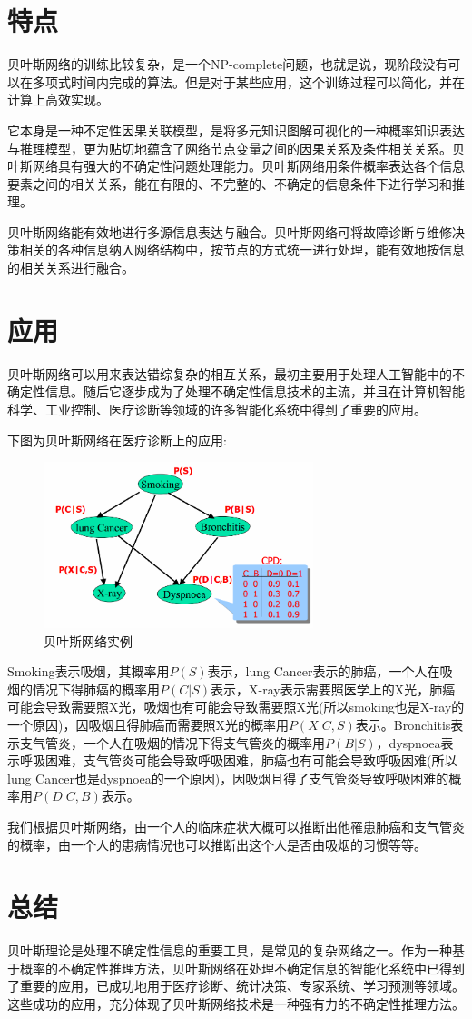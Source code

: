 \documentclass[11pt]{article}
\begin{document}
	\section{特点}
		贝叶斯网络的训练比较复杂，是一个NP-complete问题，也就是说，现阶段没有可以在多项式时间内完成的算法。但是对于某些应用，这个训练过程可以简化，并在计算上高效实现。\par
		它本身是一种不定性因果关联模型，是将多元知识图解可视化的一种概率知识表达与推理模型，更为贴切地蕴含了网络节点变量之间的因果关系及条件相关关系。贝叶斯网络具有强大的不确定性问题处理能力。贝叶斯网络用条件概率表达各个信息要素之间的相关关系，能在有限的、不完整的、不确定的信息条件下进行学习和推理。\par
		贝叶斯网络能有效地进行多源信息表达与融合。贝叶斯网络可将故障诊断与维修决策相关的各种信息纳入网络结构中，按节点的方式统一进行处理，能有效地按信息的相关关系进行融合。
	
	\section{应用}
		贝叶斯网络可以用来表达错综复杂的相互关系，最初主要用于处理人工智能中的不确定性信息。随后它逐步成为了处理不确定性信息技术的主流，并且在计算机智能科学、工业控制、医疗诊断等领域的许多智能化系统中得到了重要的应用。\par
		下图为贝叶斯网络在医疗诊断上的应用:\par
		\begin{figure}[htbp]
			\centering
			\includegraphics[width=0.7\textwidth]{img/instance.png}
			\caption{贝叶斯网络实例}
			\label{003}
		\end{figure}
		Smoking表示吸烟，其概率用$P(S)$表示，lung Cancer表示的肺癌，一个人在吸烟的情况下得肺癌的概率用$P(C|S)$表示，X-ray表示需要照医学上的X光，肺癌可能会导致需要照X光，吸烟也有可能会导致需要照X光(所以smoking也是X-ray的一个原因)，因吸烟且得肺癌而需要照X光的概率用$P(X|C,S)$表示。Bronchitis表示支气管炎，一个人在吸烟的情况下得支气管炎的概率用$P(B|S)$，dyspnoea表示呼吸困难，支气管炎可能会导致呼吸困难，肺癌也有可能会导致呼吸困难(所以lung Cancer也是dyspnoea的一个原因)，因吸烟且得了支气管炎导致呼吸困难的概率用$P(D|C,B)$表示。\par
		我们根据贝叶斯网络，由一个人的临床症状大概可以推断出他罹患肺癌和支气管炎的概率，由一个人的患病情况也可以推断出这个人是否由吸烟的习惯等等。
	
	\section{总结}
		贝叶斯理论是处理不确定性信息的重要工具，是常见的复杂网络之一。作为一种基于概率的不确定性推理方法，贝叶斯网络在处理不确定信息的智能化系统中已得到了重要的应用，已成功地用于医疗诊断、统计决策、专家系统、学习预测等领域。这些成功的应用，充分体现了贝叶斯网络技术是一种强有力的不确定性推理方法。
			
	

\end{document}
